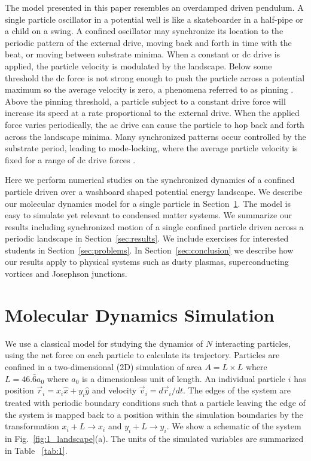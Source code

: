 \documentclass[twocolumn,preprintnumbers,amsmath,amssymb,aps,prb]{revtex4}
\begin{document}
The model presented in this paper
resembles an overdamped driven pendulum.
A single particle oscillator
in a potential well is 
like a skateboarder in a half-pipe or
a child on a swing.
A confined oscillator may 
synchronize its location
to the periodic pattern of the external drive,
moving back and forth in time with
the beat,
or moving between substrate minima.
When 
a constant or 
dc drive is applied,
the particle velocity is modulated by 
the landscape.
Below some threshold  
the dc force is not strong enough to push the particle
across a potential maximum so the average velocity is zero,
a phenomena referred to as pinning \cite{Reichhardt2017}.
Above the pinning threshold,
a particle subject to a constant
drive force will increase its speed at a rate proportional
to the external drive.  
When the applied force varies periodically,
the ac drive can 
cause the particle to hop back and forth across
the landscape minima.
Many synchronized patterns occur
controlled by the substrate period,
leading to 
mode-locking,
where the average particle velocity
is fixed for a range of dc drive forces \cite{Reichhardt2015}.

Here we perform numerical studies 
on the synchronized dynamics
of a confined particle driven over
a washboard shaped potential energy landscape.
We describe
our molecular dynamics model for a single particle in Section~\ref{sec:MD}.
The model
is easy to simulate yet relevant
to condensed matter systems.
We summarize our results 
including synchronized motion of a single confined particle
driven across a periodic landscape in 
Section~\ref{sec:results}.
We include exercises for interested students 
in Section~\ref{sec:problems}.
In Section~\ref{sec:conclusion}
we describe how our results apply 
to physical systems
such as dusty plasmas, superconducting vortices and Josephson junctions.

\section{Molecular Dynamics Simulation}
\label{sec:MD}
We use a classical model for 
studying the dynamics of $N$ interacting particles,
using the net force on each particle to calculate
its trajectory.
Particles are confined in a two-dimensional (2D) 
simulation of area $A = L \times L$ where $L=46.\bar{6} a_0$
where $a_0$ is a dimensionless unit of length.
An individual particle $i$ has
position $\vec{r}_i = x_i \hat{x} + y_i \hat{y}$
and velocity $\vec{v}_i = d\vec{r}_i/dt$.
The edges of the system are treated with
periodic boundary conditions
such that a particle leaving the edge of the system is mapped
back to a position within the simulation boundaries 
by the transformation $x_i+L \rightarrow x_i$ and $y_i+L \rightarrow y_i$.
We show a schematic of the system in Fig.~\ref{fig:1_landscape}(a).
The units of the simulated variables are summarized in Table ~\ref{tab:1}.
\end{document}
